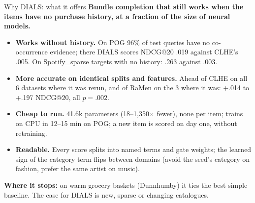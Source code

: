\documentclass[10pt,aspectratio=169]{beamer}
\newcommand{\key}[1]{\textcolor{Accent}{\textbf{#1}}}
\begin{document}
\begin{frame}{Why DIALS: what it offers}
\key{Bundle completion that still works when the items have no purchase history, at a fraction of the size of neural models.}\par
\vspace{3mm}
\small
\begin{itemize}\setlength\itemsep{4pt}
\item \key{Works without history.} On POG 96\% of test queries have no co-occurrence evidence; there DIALS scores NDCG@20 .019 against CLHE's .005. On Spotify\_sparse targets with no history: .263 against .003.
\item \key{More accurate on identical splits and features.} Ahead of CLHE on all 6 datasets where it was rerun, and of RaMen on the 3 where it was: +.014 to +.197 NDCG@20, all $p=.002$.
\item \key{Cheap to run.} 41.6k parameters (18--1,350$\times$ fewer), none per item; trains on CPU in 12--15 min on POG; a new item is scored on day one, without retraining.
\item \key{Readable.} Every score splits into named terms and gate weights; the learned sign of the category term flips between domains (avoid the seed's category on fashion, prefer the same artist on music).
\end{itemize}
\vspace{2mm}
\key{Where it stops:} on warm grocery baskets (Dunnhumby) it ties the best simple baseline. The case for DIALS is new, sparse or changing catalogues.
\end{frame}
\end{document}

